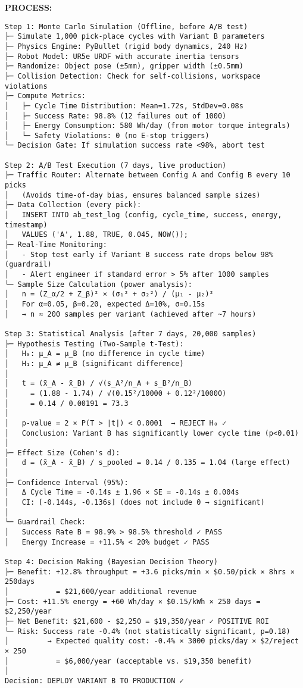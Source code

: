 \documentclass[
]{article}
\begin{document}
\textbf{PROCESS:}

\begin{verbatim}
Step 1: Monte Carlo Simulation (Offline, before A/B test)
├─ Simulate 1,000 pick-place cycles with Variant B parameters
├─ Physics Engine: PyBullet (rigid body dynamics, 240 Hz)
├─ Robot Model: UR5e URDF with accurate inertia tensors
├─ Randomize: Object pose (±5mm), gripper width (±0.5mm)
├─ Collision Detection: Check for self-collisions, workspace violations
├─ Compute Metrics:
│   ├─ Cycle Time Distribution: Mean=1.72s, StdDev=0.08s
│   ├─ Success Rate: 98.8% (12 failures out of 1000)
│   ├─ Energy Consumption: 580 Wh/day (from motor torque integrals)
│   └─ Safety Violations: 0 (no E-stop triggers)
└─ Decision Gate: If simulation success rate <98%, abort test

Step 2: A/B Test Execution (7 days, live production)
├─ Traffic Router: Alternate between Config A and Config B every 10 picks
│   (Avoids time-of-day bias, ensures balanced sample sizes)
├─ Data Collection (every pick):
│   INSERT INTO ab_test_log (config, cycle_time, success, energy, timestamp)
│   VALUES ('A', 1.88, TRUE, 0.045, NOW());
├─ Real-Time Monitoring:
│   - Stop test early if Variant B success rate drops below 98% (guardrail)
│   - Alert engineer if standard error > 5% after 1000 samples
└─ Sample Size Calculation (power analysis):
│   n = (Z_α/2 + Z_β)² × (σ₁² + σ₂²) / (μ₁ - μ₂)²
│   For α=0.05, β=0.20, expected Δ=10%, σ=0.15s
│   → n ≈ 200 samples per variant (achieved after ~7 hours)

Step 3: Statistical Analysis (after 7 days, 20,000 samples)
├─ Hypothesis Testing (Two-Sample t-Test):
│   H₀: μ_A = μ_B (no difference in cycle time)
│   H₁: μ_A ≠ μ_B (significant difference)
│
│   t = (x̄_A - x̄_B) / √(s_A²/n_A + s_B²/n_B)
│     = (1.88 - 1.74) / √(0.15²/10000 + 0.12²/10000)
│     = 0.14 / 0.00191 = 73.3
│
│   p-value = 2 × P(T > |t|) < 0.0001  → REJECT H₀ ✓
│   Conclusion: Variant B has significantly lower cycle time (p<0.01)
│
├─ Effect Size (Cohen's d):
│   d = (x̄_A - x̄_B) / s_pooled = 0.14 / 0.135 = 1.04 (large effect)
│
├─ Confidence Interval (95%):
│   Δ Cycle Time = -0.14s ± 1.96 × SE = -0.14s ± 0.004s
│   CI: [-0.144s, -0.136s] (does not include 0 → significant)
│
└─ Guardrail Check:
│   Success Rate B = 98.9% > 98.5% threshold ✓ PASS
│   Energy Increase = +11.5% < 20% budget ✓ PASS

Step 4: Decision Making (Bayesian Decision Theory)
├─ Benefit: +12.8% throughput = +3.6 picks/min × $0.50/pick × 8hrs × 250days
│           = $21,600/year additional revenue
├─ Cost: +11.5% energy = +60 Wh/day × $0.15/kWh × 250 days = $2,250/year
├─ Net Benefit: $21,600 - $2,250 = $19,350/year ✓ POSITIVE ROI
└─ Risk: Success rate -0.4% (not statistically significant, p=0.18)
│         → Expected quality cost: -0.4% × 3000 picks/day × $2/reject × 250
│           = $6,000/year (acceptable vs. $19,350 benefit)
│
Decision: DEPLOY VARIANT B TO PRODUCTION ✓
\end{verbatim}
\end{document}
